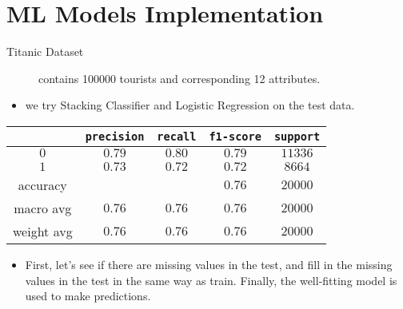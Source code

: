 \section{ML Models Implementation} \label{sec-experiment}
\begin{description}
	\item[Titanic Dataset] contains 100000 tourists and corresponding 12 attributes.
\end{description}
\vspace{.3cm}
\begin{center}
\end{center}
\vspace{.5cm}
\begin{itemize}
	\item we try Stacking Classifier and Logistic Regression on the test data.
\end{itemize}
\vspace{.5cm}
\begin{center}
	\begin{tabular}{c| c c c c}
		\toprule
		{}  & \texttt{precision} & \texttt{recall}  & \texttt{f1-score} & \texttt{support} \\
		\midrule
		$0$
		&  {$0.79$} &  {$0.80$} &  {$0.79$} &  {$11336$} \\
		$1$
		&  {$0.73$} &  {$0.72$} &  {$0.72$} &  {$8664$} \\
		accuracy
		&  {} &  {} &  {$0.76$} &  {$20000$} \\
		macro avg
		&  {$0.76$} &  {$0.76$} &  {$0.76$} &  {$20000$} \\
		weight avg
		&  {$0.76$} &  {$0.76$} &  {$0.76$} &  {$20000$} \\
		\bottomrule
	\end{tabular}
\end{center}
\vspace{.5cm}
\begin{itemize}
	\item First, let’s see if there are missing values in the test, and fill in the missing values in the test in the same way as train. Finally, the well-fitting model is used to make predictions.
\end{itemize}

